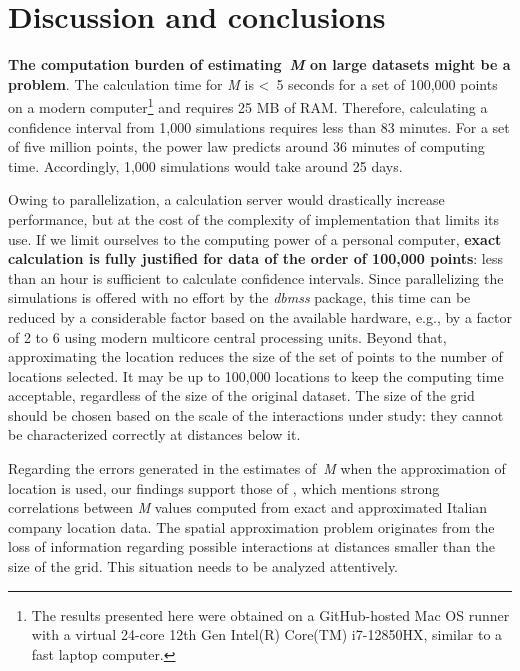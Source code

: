 \documentclass[fleqn,10pt]{latex/stylish_article} %
\begin{document}
\section{Discussion and conclusions}\label{discussion-and-conclusions}

\textbf{The computation burden of estimating~\emph{M} on large datasets might be a problem}.
The calculation time for \emph{M} is \textless~5 seconds for a set of 100,000 points on a modern computer\footnote{The results presented here were obtained on a GitHub-hosted Mac OS runner with a virtual 24-core 12th Gen Intel(R) Core(TM) i7-12850HX, similar to a fast laptop computer.} and requires 25 MB of RAM.
Therefore, calculating a confidence interval from 1,000 simulations requires less than 83 minutes.
For a set of five million points, the power law predicts around 36 minutes of computing time.
Accordingly, 1,000 simulations would take around 25 days.

Owing to parallelization, a calculation server would drastically increase performance, but at the cost of the complexity of implementation that limits its use.
If we limit ourselves to the computing power of a personal computer, \textbf{exact calculation is fully justified for data of the order of 100,000 points}: less than an hour is sufficient to calculate confidence intervals.
Since parallelizing the simulations is offered with no effort by the \emph{dbmss} package, this time can be reduced by a considerable factor based on the available hardware, e.g., by a factor of 2 to 6 using modern multicore central processing units.
Beyond that, approximating the location reduces the size of the set of points to the number of locations selected.
It may be up to 100,000 locations to keep the computing time acceptable, regardless of the size of the original dataset.
The size of the grid \citep[or the administrative scale of the aggregation of points in][]{Tidu2023} should be chosen based on the scale of the interactions under study: they cannot be characterized correctly at distances below it.

Regarding the errors generated in the estimates of~\emph{M} when the approximation of location is used, our findings support those of \citet{Tidu2023}, which mentions strong correlations between \emph{M} values computed from exact and approximated Italian company location data.
The spatial approximation problem originates from the loss of information regarding possible interactions at distances smaller than the size of the grid.
This situation needs to be analyzed attentively.
\end{document}
